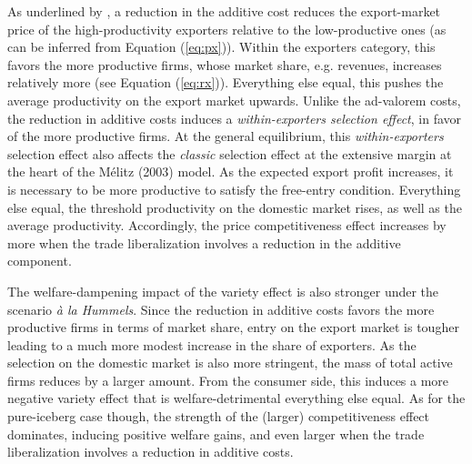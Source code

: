 \documentclass[a4paper,11pt]{article}
\begin{document}
As underlined by \cite{sorensen2014}, a reduction in the additive cost reduces the export-market price of the high-productivity
exporters relative to the low-productive ones (as can be inferred from Equation (\ref{eq:px})).
Within the exporters category, this favors the more productive firms, whose market share,
e.g. revenues, increases relatively more (see Equation (\ref{eq:rx})). Everything else equal, this
pushes the average productivity on the export market upwards. Unlike the ad-valorem
costs, the reduction in additive costs induces a \textit{within-exporters selection effect}, in favor of
the more productive firms. At the general equilibrium, this \textit{within-exporters} selection effect
also affects the \textit{classic} selection effect at the extensive margin at the heart of the M\'{e}litz
(2003) model. As the expected export profit increases, it is necessary to be more productive
to satisfy the free-entry condition. Everything else equal, the threshold productivity
on the domestic market rises, as well as the average productivity. Accordingly, the
price competitiveness effect increases by more when the trade liberalization involves a reduction
in the additive component.

The welfare-dampening impact of the variety effect is also stronger under the scenario \textit{à la Hummels}. Since the reduction in additive costs favors the more productive firms in terms of market share,
entry on the export market is tougher leading to a much more modest increase in the
share of exporters. As the selection on the domestic market is also more stringent, the
mass of total active firms reduces by a larger amount. From the consumer side, this induces
a more negative variety effect that is welfare-detrimental everything else equal. As for the
pure-iceberg case though, the strength of the (larger) competitiveness effect dominates,
inducing positive welfare gains, and even larger when the trade liberalization involves a
reduction in additive costs.\medskip
\end{document}
